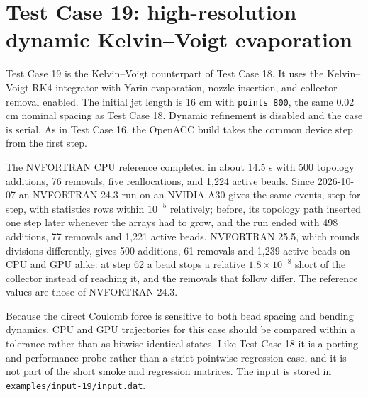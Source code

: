 \section{Test Case 19: high-resolution dynamic Kelvin--Voigt evaporation}

Test Case 19 is the Kelvin--Voigt counterpart of Test Case 18.  It uses the
Kelvin--Voigt RK4 integrator with Yarin evaporation, nozzle insertion, and
collector removal enabled.  The initial jet length is 16 cm with
\texttt{points 800}, the same 0.02 cm nominal spacing as Test Case 18.
Dynamic refinement is disabled and the case is serial.  As in Test Case 16,
the OpenACC build takes the common device step from the first step.

The NVFORTRAN CPU reference completed in about 14.5 s with 500 topology
additions, 76 removals, five reallocations, and 1,224 active beads.  Since
2026-10-07 an NVFORTRAN 24.3 run on an NVIDIA A30 gives the same events,
step for step, with statistics rows within $10^{-5}$ relatively; before, its
topology path inserted one step later whenever the arrays had to grow, and
the run ended with 498 additions, 77 removals and 1,221 active beads.
NVFORTRAN 25.5, which rounds divisions differently, gives 500 additions,
61 removals and 1,239 active beads on CPU and GPU alike: at step 62 a bead
stops a relative $1.8\times10^{-8}$ short of the collector instead of
reaching it, and the removals that follow differ.  The reference values are
those of NVFORTRAN 24.3.

Because the direct
Coulomb force is sensitive to both bead spacing and bending dynamics, CPU and
GPU trajectories for this case should be compared within a tolerance rather
than as bitwise-identical states.  Like Test Case 18 it is a porting and
performance probe rather than a strict pointwise regression case, and it is
not part of the short smoke and regression matrices.  The input is stored in
\texttt{examples/input-19/input.dat}.
